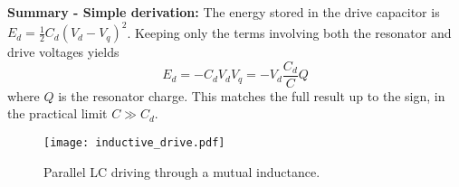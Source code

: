 \textbf{Summary - Simple derivation:} The energy stored in the drive capacitor is $E_d = \frac{1}{2}C_d\left( V_d - V_q \right)^2$.
Keeping only the terms involving both the resonator and drive voltages yields
\begin{equation}
  E_d = - C_d V_d V_q = - V_d \frac{C_d}{C} Q
\end{equation}
where $Q$ is the resonator charge.
This matches the full result up to the sign, in the practical limit $C \gg C_d$.



\begin{figure}
\begin{centering}
\texttt{[image: inductive\_drive.pdf]}
\par\end{centering}
  \caption{Parallel LC driving through a mutual inductance.}
\label{fig:qubits.inductive_drive}
\end{figure}

